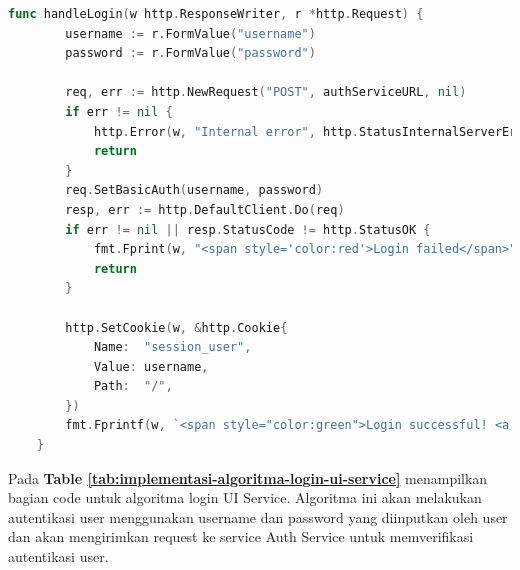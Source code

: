 \begin{table}[H]
  \centering
  \begin{minipage}{0.95\linewidth}
    \begin{lstlisting}[language=go, basicstyle=\footnotesize\ttfamily]
      func handleLogin(w http.ResponseWriter, r *http.Request) {
        username := r.FormValue("username")
        password := r.FormValue("password")
    
        req, err := http.NewRequest("POST", authServiceURL, nil)
        if err != nil {
            http.Error(w, "Internal error", http.StatusInternalServerError)
            return
        }
        req.SetBasicAuth(username, password)
        resp, err := http.DefaultClient.Do(req)
        if err != nil || resp.StatusCode != http.StatusOK {
            fmt.Fprint(w, "<span style='color:red'>Login failed</span>")
            return
        }
    
        http.SetCookie(w, &http.Cookie{
            Name:  "session_user",
            Value: username,
            Path:  "/",
        })
        fmt.Fprintf(w, `<span style="color:green">Login successful! <a href="/protected">Go to protected page</a></span><br><em>Version: %s</em>`, version)
    }
    \end{lstlisting}
  \end{minipage}
  \caption{Implementasi Algoritma Login UI Service}
  \label{tab:implementasi-algoritma-login-ui-service}
\end{table}
Pada \textbf{Table \ref{tab:implementasi-algoritma-login-ui-service}} menampilkan bagian
code untuk algoritma login UI Service. Algoritma ini akan melakukan autentikasi
user menggunakan username dan password yang diinputkan oleh user dan akan
mengirimkan request ke service Auth Service untuk memverifikasi autentikasi
user.

